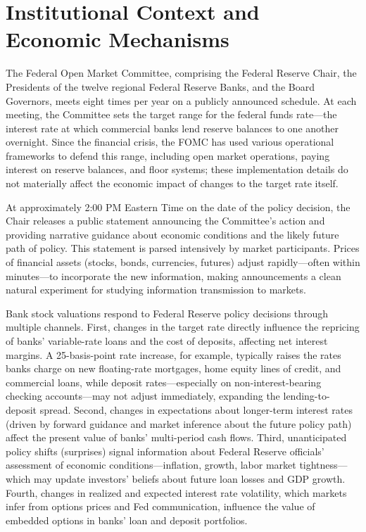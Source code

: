 \documentclass{article}
\begin{document}
\section{Institutional Context and Economic Mechanisms}

The Federal Open Market Committee, comprising the Federal Reserve Chair, the Presidents of the twelve regional Federal Reserve Banks, and the Board Governors, meets eight times per year on a publicly announced schedule. At each meeting, the Committee sets the target range for the federal funds rate—the interest rate at which commercial banks lend reserve balances to one another overnight. Since the financial crisis, the FOMC has used various operational frameworks to defend this range, including open market operations, paying interest on reserve balances, and floor systems; these implementation details do not materially affect the economic impact of changes to the target rate itself.

At approximately 2:00 PM Eastern Time on the date of the policy decision, the Chair releases a public statement announcing the Committee's action and providing narrative guidance about economic conditions and the likely future path of policy. This statement is parsed intensively by market participants. Prices of financial assets (stocks, bonds, currencies, futures) adjust rapidly—often within minutes—to incorporate the new information, making announcements a clean natural experiment for studying information transmission to markets.

Bank stock valuations respond to Federal Reserve policy decisions through multiple channels. First, changes in the target rate directly influence the repricing of banks' variable-rate loans and the cost of deposits, affecting net interest margins. A 25-basis-point rate increase, for example, typically raises the rates banks charge on new floating-rate mortgages, home equity lines of credit, and commercial loans, while deposit rates—especially on non-interest-bearing checking accounts—may not adjust immediately, expanding the lending-to-deposit spread. Second, changes in expectations about longer-term interest rates (driven by forward guidance and market inference about the future policy path) affect the present value of banks' multi-period cash flows. Third, unanticipated policy shifts (surprises) signal information about Federal Reserve officials' assessment of economic conditions—inflation, growth, labor market tightness—which may update investors' beliefs about future loan losses and GDP growth. Fourth, changes in realized and expected interest rate volatility, which markets infer from options prices and Fed communication, influence the value of embedded options in banks' loan and deposit portfolios.
\end{document}
